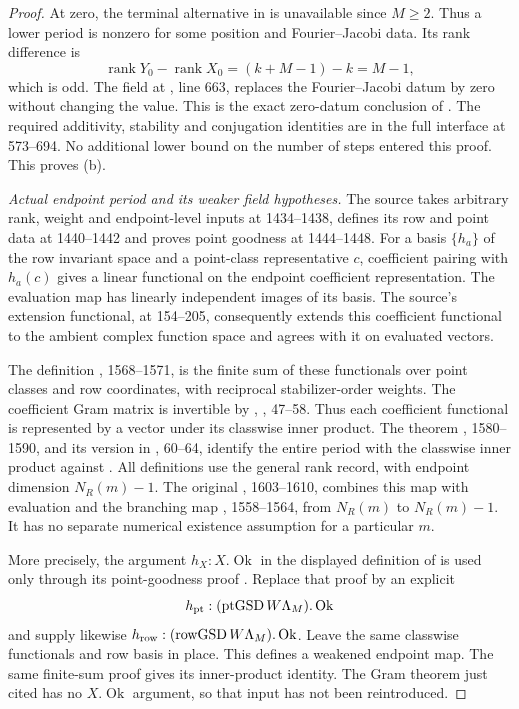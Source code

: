\begin{proof}
At zero, the terminal alternative in  is unavailable since
$M\ge2$. Thus a lower period is nonzero for some position and
Fourier--Jacobi data. Its rank difference is
\[
 \operatorname{rank}Y_0-\operatorname{rank}X_0
       =(k+M-1)-k=M-1,
\]
which is odd. The field  at
, line 663, replaces the Fourier--Jacobi datum by zero
without changing the value. This is the exact zero-datum conclusion of
. The required additivity, stability and conjugation
identities are in the full  interface at 573--694.
No additional lower bound on the number of steps entered this proof.
This proves (b).

\textit{Actual endpoint period and its weaker field hypotheses.}
The source  takes arbitrary
rank, weight and endpoint-level inputs at 1434--1438, defines its row and
point data at 1440--1442 and proves point goodness at 1444--1448.
For a basis $\{h_a\}$ of the row invariant space and a point-class
representative $c$, coefficient pairing with $h_a(c)$ gives a linear
functional on the endpoint coefficient representation.
The evaluation map has linearly independent images of its basis.
The source's extension functional, at 154--205, consequently extends
this coefficient functional to the ambient complex function space and
agrees with it on evaluated vectors.

The definition , 1568--1571, is the finite sum of these
functionals over point classes and row coordinates, with reciprocal
stabilizer-order weights.
The coefficient Gram matrix is invertible by
, , 47--58.
Thus each coefficient functional is represented by a vector under its
classwise inner product. The theorem
, 1580--1590, and its version in
, 60--64, identify the entire period with the
classwise inner product against .
All definitions use the general rank record, with endpoint dimension
$N_R(m)-1$.
The original , 1603--1610, combines this map with evaluation
and the branching map , 1558--1564, from $N_R(m)$ to $N_R(m)-1$.
It has no separate numerical existence assumption for a particular $m$.

More precisely, the argument $h_X:X.\operatorname{Ok}$ in the displayed
definition of  is used only through its point-goodness
proof .
Replace that proof by an explicit
\[
 h_{\rm pt}:(\operatorname{ptGSD}W\Lambda_M).\operatorname{Ok}
\]
and supply likewise
$h_{\rm row}:(\operatorname{rowGSD}W\Lambda_M).\operatorname{Ok}$.
Leave the same classwise functionals and row basis in place.
This defines a weakened endpoint map.
The same finite-sum proof gives its inner-product identity.
The Gram theorem just cited has no $X.\operatorname{Ok}$ argument,
so that input has not been reintroduced.


\end{proof}
